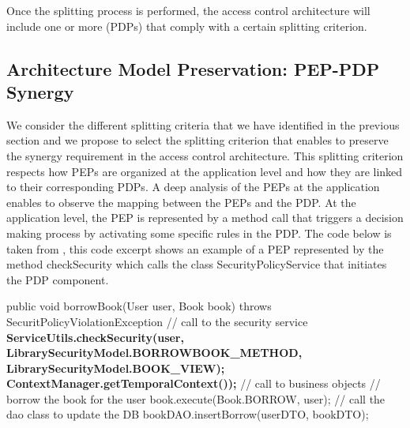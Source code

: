 Once the splitting process is performed, the access control architecture will include one or more (PDPs) that comply with a certain splitting criterion.
 
\subsection{Architecture Model Preservation: PEP-PDP Synergy}
We consider the different splitting criteria that we have identified in the previous section and we propose to select the splitting criterion that 
enables to preserve the synergy requirement in the access control architecture. This splitting criterion respects how PEPs are organized 
at the application level and how they are linked to their corresponding PDPs.
A deep analysis of the PEPs at the application enables to observe the mapping between the PEPs and the PDP. At the application level, the PEP
is represented by a method call that triggers a decision making process by activating some specific rules in the PDP.
The code below is taken from \cite{legacy}, this code excerpt shows an example of a PEP represented by the method checkSecurity which calls the class 
SecurityPolicyService that initiates the PDP component.
\begin{algorithmic}
\begin{algorithm}[!h]
   \STATE public void borrowBook(User user, Book book)
   \STATE throws SecuritPolicyViolationException {
   \STATE   // call to the security service
\STATE \hspace{0.5cm} \textbf{ServiceUtils.checkSecurity(user,
\STATE LibrarySecurityModel.BORROWBOOK\_METHOD,
\STATE LibrarySecurityModel.BOOK\_VIEW);
\STATE ContextManager.getTemporalContext());}
    \STATE  // call to business objects
    \STATE  // borrow the book for the user
\STATE \hspace{0.5cm} book.execute(Book.BORROW, user);
\STATE      // call the dao class to update the DB
\STATE \hspace{0.5cm} bookDAO.insertBorrow(userDTO, bookDTO);}
\end{algorithm}
\end{algorithmic}

